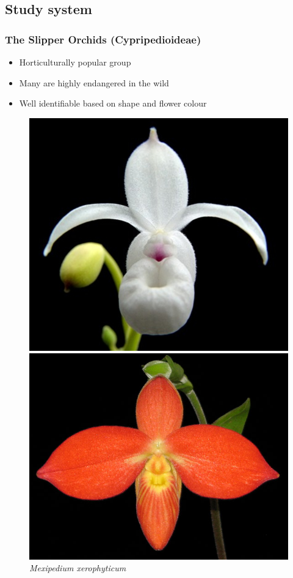 \documentclass[]{beamer}
\begin{document}
    \subsection{Study system}
    \begin{frame}
        \frametitle{The Slipper Orchids (Cypripedioideae)}
        \begin{itemize}
            \item Horticulturally popular group
            \item Many are highly endangered in the wild
            \item Well identifiable based on shape and flower colour
        \end{itemize}

        \begin{figure}[!htb]
              \includegraphics[width=\linewidth]{Mexipedium_xerophyticum}
              \caption*{\textit{Mexipedium xerophyticum}}
            \endminipage\hfill
              \includegraphics[width=\linewidth]{Phragmipedium_besseae}

\end{figure}
\end{frame}
\end{document}
